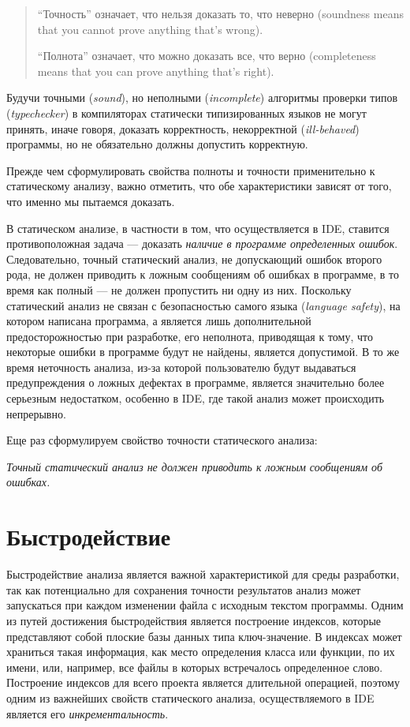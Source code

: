 \begin{quote}
``Точность'' означает, что нельзя доказать то, что неверно (soundness means that
you cannot prove anything that's wrong).

``Полнота'' означает, что можно доказать все, что верно (completeness means that
you can prove anything that's right).
\end{quote}

Будучи точными (\emph{sound}), но неполными (\emph{incomplete}) алгоритмы
проверки типов (\emph{typechecker}) в компиляторах статически типизированных языков не
могут принять, иначе говоря, доказать корректность, некорректной (\emph{ill-behaved})
программы, но не обязательно должны допустить корректную.

Прежде чем сформулировать свойства полноты и точности применительно к
статическому анализу, важно отметить, что обе характеристики зависят от того,
что именно мы пытаемся доказать.

В статическом анализе, в частности в том, что осуществляется в IDE, ставится
противоположная задача --- доказать \emph{наличие в программе определенных
  ошибок}.  Следовательно, точный статический анализ, не допускающий ошибок
второго рода, не должен приводить к ложным сообщениям об ошибках в программе, в
то время как полный --- не должен пропустить ни одну из них. Поскольку
статический анализ не связан с безопасностью самого языка (\emph{language
  safety}), на котором написана программа, а является лишь дополнительной
предосторожностью при разработке, его неполнота, приводящая к тому, что
некоторые ошибки в программе будут не найдены, является допустимой. В то же
время неточность анализа, из-за которой пользователю будут выдаваться
предупреждения о ложных дефектах в программе, является значительно более
серьезным недостатком, особенно в IDE, где такой анализ может происходить
непрерывно.

Еще раз сформулируем свойство точности статического анализа:

\emph{Точный статический анализ не должен приводить к ложным сообщениям об 
ошибках.}

\section{Быстродействие}
\label{sec:performance-requirement}

Быстродействие анализа является важной характеристикой для среды разработки, так
как потенциально для сохранения точности результатов анализ может запускаться
при каждом изменении файла с исходным текстом программы. Одним из путей
достижения быстродействия является построение индексов, которые представляют
собой плоские базы данных типа ключ-значение. В индексах может храниться такая
информация, как место определения класса или функции, по их имени, или,
например, все файлы в которых встречалось определенное слово. Построение
индексов для всего проекта является длительной операцией, поэтому одним из
важнейших свойств статического анализа, осуществляемого в IDE является его
\emph{инкрементальность}.

